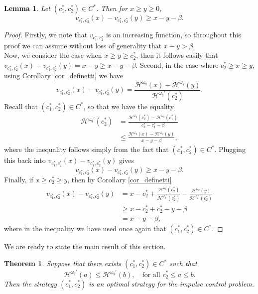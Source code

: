 \documentclass[10pt,a4paper]{amsart}
\newtheorem{theorem}{Theorem}[section]
\newtheorem{lemma}{Lemma}[section]
\newcommand{\cH}{\mathcal{H}}
\newcommand{\homega}{\omega_q}
\renewcommand{\leq}{\leqslant}
\renewcommand{\geq}{\geqslant}
\begin{document}
\begin{lemma}\label{lem:HJB:1}
	Let $(c_1^\ast,c_2^\ast) \in C^\ast$. Then for $x \geq y \geq 0$,
	\begin{equation}\label{eq:lin:ineq}
		v_{c_1^\ast,c_2^\ast}(x) - v_{c_1^\ast,c_2^\ast}(y) \geq x - y -\beta.
	\end{equation}
\end{lemma}
\begin{proof}
	Firstly, we note that $v_{c_1^\ast,c_2^\ast}$ is an increasing function, so throughout this proof we can assume without loss of generality that $x - y > \beta$.\\
	Now, we consider the case when $x \geq y \geq c_2^\ast$, then it follows easily that $v_{c_1^\ast,c_2^\ast}(x) - v_{c_1^\ast,c_2^\ast}(y) = x-y \geq x-y-\beta$. Second, in the case where $c_2^\ast \geq x \geq y$, using Corollary \ref{cor_definetti} we have
	\[
	v_{c_1^\ast,c_2^\ast}(x) - v_{c_1^\ast,c_2^\ast}(y) = \frac{\cH^{\homega}(x) - \cH^{\homega}(y)}{\cH^{\homega\prime}(c_2^\ast)}.
	\]
	Recall that $(c_1^\ast,c_2^\ast) \in C^\ast$, so that we have the equality
	\begin{align*}
		\cH^{\homega\prime}(c_2^\ast) &= \frac{\cH^{\homega}(c_2^\ast) - \cH^{\homega}(c_1^\ast)}{c_2^\ast - c_1^\ast - \beta}\\
		&\leq \frac{\cH^{\homega}(x) - \cH^{\homega}(y)}{x - y - \beta},
	\end{align*}
	where the inequality follows simply from the fact that $(c_1^\ast,c_2^\ast) \in C^\ast$. Plugging this back into $v_{c_1^\ast,c_2^\ast}(x) - v_{c_1^\ast,c_2^\ast}(y)$ gives
	\[
	v_{c_1^\ast,c_2^\ast}(x) - v_{c_1^\ast,c_2^\ast}(y) \geq x - y -\beta.
	\]
	Finally, if $x \geq c_2^\ast \geq y$, then by Corollary \ref{cor_definetti}
	\begin{align*}
		v_{c_1^\ast,c_2^\ast}(x) - v_{c_1^\ast,c_2^\ast}(y) &= x - c_2^\ast + \frac{\cH^{\homega}(c_2^\ast)}{\cH^{\homega\prime}(c_2^\ast)} - \frac{\cH^{\homega}(y)}{\cH^{\homega\prime}(c_2^\ast)} \\
		& \geq x - c_2^\ast + c_2^\ast - y - \beta \\ &= x-y-\beta,
	\end{align*}
	where in the inequality we have used once again that $(c_1^\ast,c_2^\ast) \in C^\ast$.
\end{proof}
We are ready to state the main result of this section.
\begin{theorem}
	Suppose that there exists $(c_1^\ast,c_2^\ast) \in C^\ast$ such that
	\[
	\cH^{\homega\prime}(a) \leq \cH^{\homega\prime}(b), \quad \text{for all } c_2^\ast \leq a \leq b.
	\]
	Then the strategy $(c_1^\ast,c_2^\ast)$ is an optimal strategy for the impulse control problem.
\end{theorem}
\end{document}
